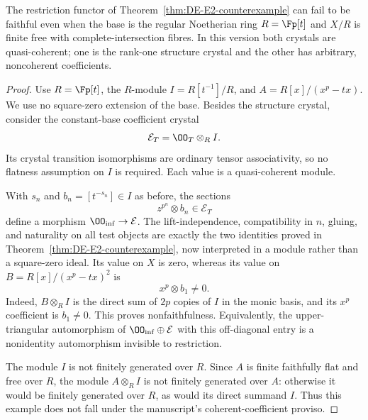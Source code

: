 \begin{corollary}\label{cor:DE-E2-Noetherian-counterexample}
The restriction functor of Theorem~\ref{thm:DE-E2-counterexample} can fail to be faithful even when the base is the regular Noetherian ring $R=\Fp[t]$ and $X/R$ is finite free with complete-intersection fibres.  In this version both crystals are quasi-coherent; one is the rank-one structure crystal and the other has arbitrary, noncoherent coefficients.
\end{corollary}
\begin{proof}
Use $R=\Fp[t]$, the $R$-module $I=R[t^{-1}]/R$, and $A=R[x]/(x^p-tx)$.  We use no square-zero extension of the base.  Besides the structure crystal, consider the constant-base coefficient crystal
\[
                 \mathcal E_T=\OO_T\otimes_R I.
\]
Its crystal transition isomorphisms are ordinary tensor associativity, so no flatness assumption on $I$ is required.  Each value is a quasi-coherent module.

With $s_n$ and $b_n=[t^{-s_n}]\in I$ as before, the sections
\[
                    z^{p^n}\otimes b_n\in\mathcal E_T
\]
define a morphism $\OO_{\rm inf}\to\mathcal E$.  The lift-independence, compatibility in $n$, gluing, and naturality on all test objects are exactly the two identities proved in Theorem~\ref{thm:DE-E2-counterexample}, now interpreted in a module rather than a square-zero ideal.  Its value on $X$ is zero, whereas its value on $B=R[x]/(x^p-tx)^2$ is
\[
                         x^p\otimes b_1\ne0.
\]
Indeed, $B\otimes_R I$ is the direct sum of $2p$ copies of $I$ in the monic basis, and its $x^p$ coefficient is $b_1\ne0$.  This proves nonfaithfulness.  Equivalently, the upper-triangular automorphism of $\OO_{\rm inf}\oplus\mathcal E$ with this off-diagonal entry is a nonidentity automorphism invisible to restriction.

The module $I$ is not finitely generated over $R$.  Since $A$ is finite faithfully flat and free over $R$, the module $A\otimes_R I$ is not finitely generated over $A$: otherwise it would be finitely generated over $R$, as would its direct summand $I$.  Thus this example does not fall under the manuscript's coherent-coefficient proviso.
\end{proof}

